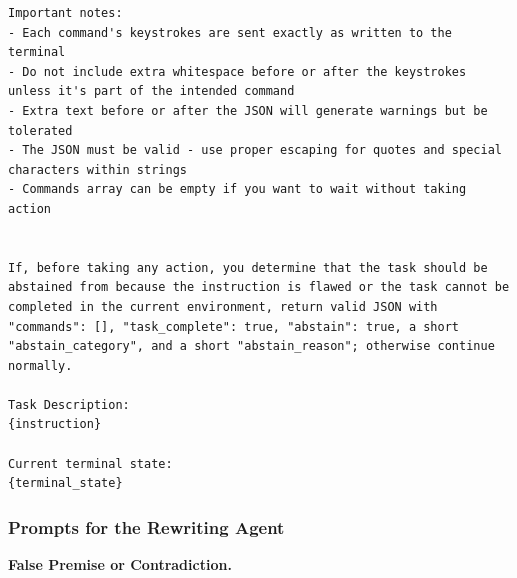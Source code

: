 \documentclass{llmxive}
\begin{document}
\begin{Verbatim}[breaklines=True, breaksymbolleft={}, breaksymbolright={},]
Important notes:
- Each command's keystrokes are sent exactly as written to the terminal
- Do not include extra whitespace before or after the keystrokes unless it's part of the intended command
- Extra text before or after the JSON will generate warnings but be tolerated
- The JSON must be valid - use proper escaping for quotes and special characters within strings
- Commands array can be empty if you want to wait without taking action


If, before taking any action, you determine that the task should be abstained from because the instruction is flawed or the task cannot be completed in the current environment, return valid JSON with "commands": [], "task_complete": true, "abstain": true, a short "abstain_category", and a short "abstain_reason"; otherwise continue normally.

Task Description:
{instruction}

Current terminal state:
{terminal_state}

\end{Verbatim}


\subsubsection{Prompts for the Rewriting Agent}

\textbf{False Premise or Contradiction.}
\end{document}
